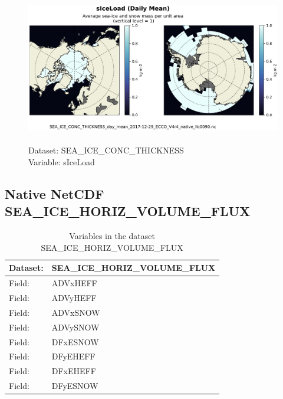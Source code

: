 \begin{figure}[H]
\centering
\includegraphics[scale=0.5]{../images/plots/native_plots/Sea-Ice_and_Snow_Concentration_and_Thickness/sIceLoad.png}
\caption{\\Dataset: SEA\_ICE\_CONC\_THICKNESS\\Variable: sIceLoad}
\label{tab:table-SEA_ICE_CONC_THICKNESS_sIceLoad-Plot}
\end{figure}
\pagebreak
\subsection{Native NetCDF SEA\_ICE\_HORIZ\_VOLUME\_FLUX}
\newp
\begin{longtable}{|p{}|p{}|}
\caption{Variables in the dataset SEA\_ICE\_HORIZ\_VOLUME\_FLUX}
\label{tab:table-SEA_ICE_HORIZ_VOLUME_FLUX-fields} \\ 
\hline \endhead \hline \endfoot
\rowcolor{lightgray} \textbf{Dataset:} & \textbf{SEA\_ICE\_HORIZ\_VOLUME\_FLUX} \\ \hline
Field: &ADVxHEFF \\ \hline
Field: &ADVyHEFF \\ \hline
Field: &ADVxSNOW \\ \hline
Field: &ADVySNOW \\ \hline
Field: &DFxESNOW \\ \hline
Field: &DFyEHEFF \\ \hline
Field: &DFxEHEFF \\ \hline
Field: &DFyESNOW \\ \hline
\end{longtable}

\pagebreak
